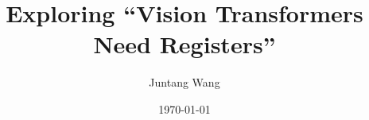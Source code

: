 \title%
[ViT-RGTS]%
{Exploring ``Vision Transformers Need Registers''}%

\author%
[Juntang Wang]%
{%
  Juntang Wang\footnotemark[1] 
}


\date%
[\today]%
{\today}
